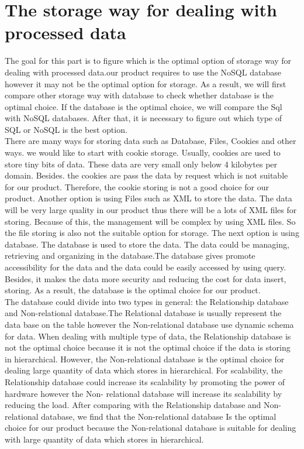         \section{The storage way for dealing with processed data}
        The goal for this part is to figure which is the optimal option of storage way for dealing with  processed data.our product requires to use the NoSQL database however it may not be the optimal option for storage. As a result, we will first compare other storage way with database to check whether database is the optimal choice. If the database is the optimal choice, we will compare the Sql with NoSQL databases. After that, it is necessary to figure out which type of SQL or NoSQL is the best option.\\
    
        \noindent There are many ways for storing data such as Database, Files, Cookies and other ways. we would like to start with cookie storage. Usually, cookies are used to store tiny bits of data. These data are very small only below 4 kilobytes per domain\cite{W1}. Besides. the cookies are pass the data by request which is not suitable for our product. Therefore, the cookie storing is not a good choice for our product. Another option is using Files such as XML to store the data. The data will be very large quality in our product thus there will be a lots of XML files for storing. Because of this, the management will be complex by using XML files. So the file storing is also not the suitable option for storage. The next option is using database. The database is used to store the data. The data could be managing, retrieving and organizing in the database\cite{W2}.The database gives promote accessibility for the data and the data could be easily accessed by using query. Besides, it makes the data more security and reducing the cost for data insert, storing\cite{W3}. As a result, the database is the optimal choice for our product.\\
        
        \noindent The database could divide into two types in general: the Relationship database and Non-relational database.The Relational database is usually represent the data base on the table however the Non-relational database use dynamic schema for data. When dealing with multiple type of data, the Relationship database is not the optimal choice because it is not the optimal choice if the data is storing in hierarchical. However, the Non-relational database is the optimal choice for  dealing large quantity of data which stores in hierarchical. For scalability, the Relationship database could increase its scalability by promoting the power of hardware however the Non- relational database will increase its scalability by reducing the load. After comparing with the Relationship database and Non-relational database, we find that the Non-relational database Is the optimal choice for our product because the Non-relational database is suitable for dealing with large quantity of data which stores in hierarchical\cite{W4}.\\
	
